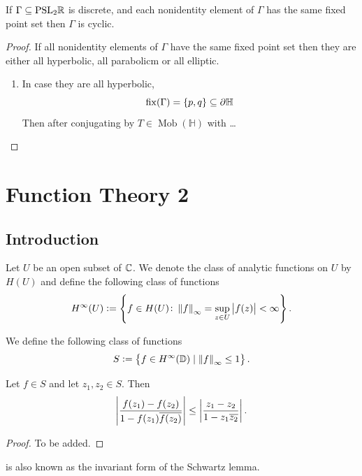 \documentclass[11pt,a4paper]{article}
\renewcommand{\H}{\mathbb H}
\DeclareMathOperator{\Mob}{Mob}
\begin{document}
\begin{theorem}
  If $\Gamma \subseteq \mathrm{PSL}_2\mathbb{R}$ is discrete, and each nonidentity
  element of $\Gamma$ has the same fixed point set then
  $\Gamma$ is cyclic.
\end{theorem}
\begin{proof}
  If all nonidentity elements of $\Gamma$ have the same fixed
  point set then they are either all hyperbolic, all parabolicm
  or all elliptic.
  \begin{enumerate}
    \item[(1)] In case they are all hyperbolic,
      \[
        \mathrm{fix}(\Gamma) = \set{p,q} \subseteq \partial \H
      \]
      Then after conjugating by $T \in \Mob(\H)$ with \dots
  \end{enumerate}
\end{proof}

\newpage
\section{Function Theory 2}
\subsection{Introduction}
\begin{definition}
  Let $U$ be an open subset of $\mathbb{C}$.
  We denote the class of analytic functions on $U$
  by $H(U)$ and define the following class of functions
  \[
    H^{\infty}(U) :=
    \left\{f \in H(U) \colon \left\lVert f\right\rVert_{\infty} = \sup_{z \in U}
    \left\lvert f(z)\right\rvert < \infty\right\}.
  \]
\end{definition}

\begin{definition}
  We define the following class of functions
  \[
    S := \left\{f \in H^{\infty}(\mathbb{D}) \mid \left\lVert f\right\rVert_{\infty} \le 1\right\}.
  \]
\end{definition}

\begin{proposition}
  \label{prop:schwartz-pick}
  Let $f \in S$ and let $z_1,z_2 \in S$.
  Then
  \[
    \left\lvert\frac{f(z_1) - f(z_2)}{1 - f(z_1) \overline{f(z_2)}}\right\rvert \le
    \left\lvert\frac{z_1 - z_2}{1 - z_1 \overline{z_2}}\right\rvert.
  \]
\end{proposition}
\begin{proof}
  To be added.
\end{proof}
\begin{remark}
   is also known as the invariant form of
  the Schwartz lemma.
\end{remark}
\end{document}
